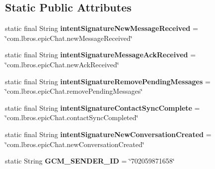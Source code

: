 \subsection*{Static Public Attributes}
\begin{DoxyCompactItemize}
\item 
\hypertarget{classcom_1_1lbros_1_1epicchat_1_1_main_activity_a997cec7acf5a4563f2dd852825c4fe72}{static final String {\bfseries intent\-Signature\-New\-Message\-Received} = \char`\"{}com.\-lbros.\-epic\-Chat.\-new\-Message\-Received\char`\"{}}\label{classcom_1_1lbros_1_1epicchat_1_1_main_activity_a997cec7acf5a4563f2dd852825c4fe72}

\item 
\hypertarget{classcom_1_1lbros_1_1epicchat_1_1_main_activity_aa0b009ede86a5e65b01e9a73661a6937}{static final String {\bfseries intent\-Signature\-Message\-Ack\-Received} = \char`\"{}com.\-lbros.\-epic\-Chat.\-new\-Ack\-Received\char`\"{}}\label{classcom_1_1lbros_1_1epicchat_1_1_main_activity_aa0b009ede86a5e65b01e9a73661a6937}

\item 
\hypertarget{classcom_1_1lbros_1_1epicchat_1_1_main_activity_acacd81951147ea9a1ab2c5811059af5d}{static final String {\bfseries intent\-Signature\-Remove\-Pending\-Messages} = \char`\"{}com.\-lbros.\-epic\-Chat.\-remove\-Pending\-Messages\char`\"{}}\label{classcom_1_1lbros_1_1epicchat_1_1_main_activity_acacd81951147ea9a1ab2c5811059af5d}

\item 
\hypertarget{classcom_1_1lbros_1_1epicchat_1_1_main_activity_a3399704bcb1cbf54ccd453f6cab7486d}{static final String {\bfseries intent\-Signature\-Contact\-Sync\-Complete} = \char`\"{}com.\-lbros.\-epic\-Chat.\-contact\-Sync\-Completed\char`\"{}}\label{classcom_1_1lbros_1_1epicchat_1_1_main_activity_a3399704bcb1cbf54ccd453f6cab7486d}

\item 
\hypertarget{classcom_1_1lbros_1_1epicchat_1_1_main_activity_a696073f0d464270ffed5066ff188a831}{static final String {\bfseries intent\-Signature\-New\-Conversation\-Created} = \char`\"{}com.\-lbros.\-epic\-Chat.\-new\-Conversation\-Created\char`\"{}}\label{classcom_1_1lbros_1_1epicchat_1_1_main_activity_a696073f0d464270ffed5066ff188a831}

\item 
\hypertarget{classcom_1_1lbros_1_1epicchat_1_1_main_activity_ab5bec119eaa22e4275086c43266beb2f}{static String {\bfseries G\-C\-M\-\_\-\-S\-E\-N\-D\-E\-R\-\_\-\-I\-D} = \char`\"{}702059871658\char`\"{}}\label{classcom_1_1lbros_1_1epicchat_1_1_main_activity_ab5bec119eaa22e4275086c43266beb2f}


\end{DoxyCompactItemize}

